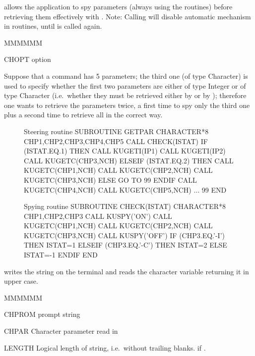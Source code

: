 \Action allows the application to spy parameters
(always using the \KUGETx{} routines) before retrieving them
effectively with \KUGETx{}.
Note: Calling  will disable automatic  mechanism
in  routines, until  is called again.
\Pdesc\begin{DLtt}{MMMMMM}
\item[CHOPT] option
\end{DLtt}
Suppose that a command has 5 parameters; the third one (of type Character)
is used to specify whether the first two parameters are either
of type Integer or of type Character (i.e.\ whether they must be
retrieved either by  or by ); therefore one wants
to retrieve the parameters twice, a first time to spy only
the third one plus a second time to retrieve all in the correct way.
\begin{figure}[tb]\centering
\begin{XMPin}[.51]{Steering routine}
   SUBROUTINE GETPAR
   CHARACTER*8 CHP1,CHP2,CHP3,CHP4,CHP5
   CALL CHECK(ISTAT)
   IF (ISTAT.EQ.1) THEN
     CALL KUGETI(IP1)
     CALL KUGETI(IP2)
     CALL KUGETC(CHP3,NCH)
   ELSEIF (ISTAT.EQ.2) THEN
     CALL KUGETC(CHP1,NCH)
     CALL KUGETC(CHP2,NCH)
     CALL KUGETC(CHP3,NCH)
   ELSE
     GO TO 99
   ENDIF
   CALL KUGETC(CHP4,NCH)
   CALL KUGETC(CHP5,NCH)
   ...
99 END
\end{XMPin}
\begin{XMPout}[.47]{Spying routine}
      SUBROUTINE CHECK(ISTAT)
      CHARACTER*8 CHP1,CHP2,CHP3
      CALL KUSPY('ON')
      CALL KUGETC(CHP1,NCH)
      CALL KUGETC(CHP2,NCH)
      CALL KUGETC(CHP3,NCH)
      CALL KUSPY('OFF')
      IF (CHP3.EQ.'-I') THEN
        ISTAT=1
      ELSEIF (CHP3.EQ.'-C') THEN
        ISTAT=2
      ELSE
        ISTAT=-1
      ENDIF
      END
\end{XMPout}
\end{figure}

\Action writes the string  on the terminal
and reads the character variable 
returning it in upper case.
\Pdesc\begin{DLtt}{MMMMMM}
\item[CHPROM] prompt string
\item[CHPAR] Character parameter read in
\item[LENGTH] Logical length of string, i.e.\ without
trailing blanks.
 if .
\end{DLtt}

